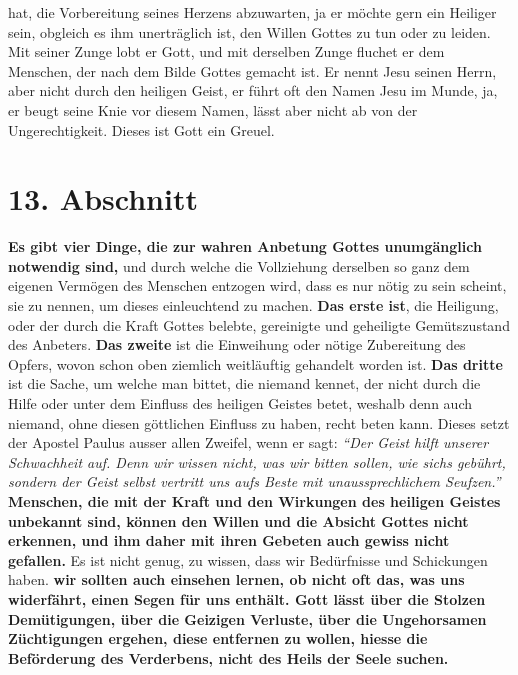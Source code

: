 hat, die
Vorbereitung seines Herzens abzuwarten, ja er möchte gern ein Heiliger
 sein,
obgleich es ihm unerträglich ist, den Willen Gottes zu tun
oder zu leiden. Mit
seiner Zunge lobt er Gott, und mit derselben Zunge fluchet er dem Menschen, der
nach dem Bilde Gottes gemacht ist.
 Er nennt Jesu
seinen Herrn, aber nicht durch den heiligen Geist, er führt oft den Namen
Jesu im Munde, ja, er beugt seine Knie vor diesem Namen, lässt aber nicht ab
von der Ungerechtigkeit. 
Dieses ist Gott ein Greuel.

\section{13. Abschnitt} \label{kap6_ab13}

\label{ref:06_13_vier_noetige_dinge}
 \textbf{Es gibt vier
Dinge, die zur wahren Anbetung
Gottes
unumgänglich
notwendig
sind,} und durch welche die Vollziehung derselben so ganz dem eigenen Vermögen
des Menschen entzogen wird, dass es nur nötig zu sein scheint, sie zu nennen,
um dieses einleuchtend zu machen. \textbf{Das erste ist}, die Heiligung, oder
der durch
die Kraft Gottes belebte, gereinigte und geheiligte Gemütszustand des Anbeters.
\textbf{Das zweite} ist die Einweihung oder nötige Zubereitung des Opfers,
wovon schon
oben ziemlich weitläuftig gehandelt worden ist. \textbf{Das dritte} ist die
Sache, um
welche man bittet, die niemand kennet, der nicht durch die Hilfe oder unter dem
Einfluss des heiligen Geistes betet, weshalb
denn auch
niemand, ohne diesen
göttlichen Einfluss zu haben, recht beten kann. Dieses setzt der Apostel
Paulus ausser allen Zweifel, wenn er sagt:
\textit{"`Der Geist hilft unserer
Schwachheit auf. Denn wir wissen nicht, was wir bitten sollen, wie sichs
gebührt, sondern der Geist selbst vertritt uns aufs Beste mit
unaussprechlichem Seufzen."'}
\textbf{Menschen, die mit der
Kraft
und den Wirkungen des heiligen Geistes unbekannt sind, können den Willen und die
Absicht Gottes nicht erkennen, und ihm daher mit ihren Gebeten auch gewiss
nicht gefallen.} Es ist nicht genug, zu wissen, dass wir Bedürfnisse und
Schickungen haben.  \textbf{wir sollten auch einsehen
lernen, ob nicht oft das,
was uns
widerfährt, einen Segen für uns enthält. Gott lässt über die
Stolzen
Demütigungen, über die Geizigen Verluste, über die
Ungehorsamen Züchtigungen
ergehen, diese entfernen zu wollen, hiesse die Beförderung des Verderbens, nicht
des Heils der Seele suchen.}

